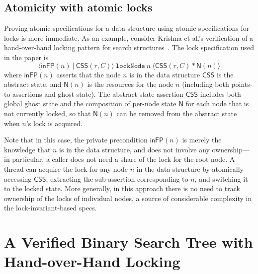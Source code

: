 \documentclass[runningheads]{llncs}
\begin{document}
\subsection{Atomicity with atomic locks}
Proving atomic specifications for a data structure using atomic specifications for locks is more immediate. As an example, consider Krishna et al.'s verification of a hand-over-hand locking pattern for search structures~\cite{templates}. The lock specification used in the paper is $$\langle \mathsf{inFP}(n)\ |\ \mathsf{CSS}(r, C) \rangle\ \mathtt{lockNode}\ n\ \langle \mathsf{CSS}(r, C) * \mathsf{N}(n)\rangle$$ where $\mathsf{inFP}(n)$ asserts that the node $n$ is in the data structure $\mathsf{CSS}$ is the abstract state, and $\mathsf{N}(n)$ is the resources for the node $n$ (including both points-to assertions and ghost state). The abstract state assertion $\mathsf{CSS}$ includes both global ghost state and the composition of per-node state $\mathsf{N}$ for each node that is not currently locked, so that $\mathsf{N}(n)$ can be removed from the abstract state when $n$'s lock is acquired.

Note that in this case, the private precondition $\mathsf{inFP}(n)$ is merely the knowledge that $n$ is in the data structure, and does not involve any ownership---in particular, a caller does not need a share of the lock for the root node. A thread can acquire the lock for any node $n$ in the data structure by atomically accessing $\mathsf{CSS}$, extracting the sub-assertion corresponding to $n$, and switching it to the locked state. More generally, in this approach there is no need to track ownership of the locks of individual nodes, a source of considerable complexity in the lock-invariant-based specs. %

\section{A Verified Binary Search Tree with Hand-over-Hand Locking}
\label{hand-over-hand}%
\end{document}
